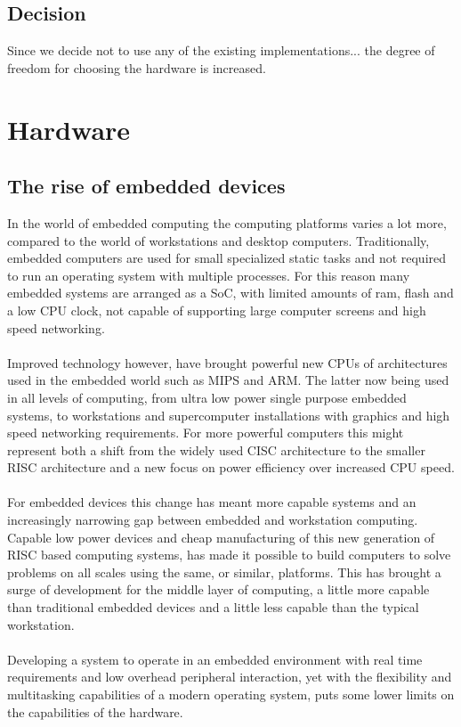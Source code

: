 \subsection{Decision}
Since we decide not to use any of the existing implementations...
the degree of freedom for choosing the hardware is increased.
\fi

\section{Hardware}

\subsection{The rise of embedded devices}
In the world of embedded computing the computing platforms varies a lot more,
compared to the world of workstations and desktop computers.
Traditionally, embedded computers are used for small specialized static tasks and
not required to run an operating system with multiple processes.
For this reason many embedded systems are arranged as a SoC,
with limited amounts of ram, flash and a low CPU clock,
not capable of supporting large computer screens and high speed networking.
\\\\
Improved technology however, have brought powerful new CPUs of architectures used in the embedded world
such as MIPS and ARM.
The latter now being used in all levels of computing, from ultra low power single purpose embedded systems,
to workstations and supercomputer installations with graphics and high speed networking requirements.
For more powerful computers this might represent both a shift from the widely used CISC architecture
to the smaller RISC architecture and a new focus on power efficiency over increased CPU speed.
\\\\
For embedded devices this change has meant more capable systems
and an increasingly narrowing gap between embedded and workstation computing.
Capable low power devices and cheap manufacturing of this new generation of RISC based computing systems,
has made it possible to build computers to solve problems on all scales using the same, or similar, platforms.
This has brought a surge of development for the middle layer of computing,
a little more capable than traditional embedded devices and a little less capable than the typical workstation.
\\\\
Developing a system to operate in an embedded environment with real time requirements
and low overhead peripheral interaction,
yet with the flexibility and multitasking capabilities of a modern operating system,
puts some lower limits on the capabilities of the hardware.

